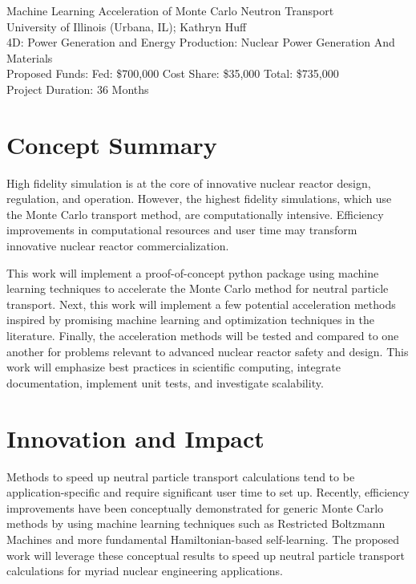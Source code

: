 \documentclass[letterpaper,12pt]{article}
\date{}
\newcommand*\fourteenpt{\fontsize{14}{14}\selectfont}
\begin{document}
\thispagestyle{fancy}
\begin{center}
{\fourteenpt Machine Learning Acceleration of Monte Carlo Neutron Transport}\\
\vspace{3mm}
University of Illinois (Urbana, IL); Kathryn Huff\\
\vspace{3mm}
4D: Power Generation and Energy Production: Nuclear Power Generation And Materials\\
Proposed Funds: Fed: \$700,000\/ Cost Share: \$35,000\/ Total: \$735,000\\
Project Duration: 36 Months\\
\end{center}

\section{Concept Summary}

High fidelity simulation is at the core of innovative nuclear reactor design,
regulation, and operation. However, the highest fidelity simulations,
which use the Monte Carlo transport method, are computationally intensive.
Efficiency improvements in computational resources and user time may transform
innovative nuclear reactor commercialization.

This work will implement a proof-of-concept python package using machine 
learning techniques to accelerate the Monte Carlo method for neutral particle transport.
Next, this work will implement a few potential acceleration methods inspired 
by promising machine learning and optimization techniques in the literature.
Finally, the acceleration methods will be tested and compared to one another for
problems relevant to advanced nuclear reactor safety and design.
This work will emphasize best practices in
scientific computing, integrate documentation, implement unit
tests, and investigate scalability. 

\section{Innovation and Impact}
Methods to speed up neutral particle transport calculations tend to be 
application-specific and require significant user time to set up. Recently, 
efficiency improvements have been conceptually demonstrated for generic Monte 
Carlo methods by using machine learning techniques such as Restricted Boltzmann 
Machines\cite{huang_accelerated_2017} and more fundamental Hamiltonian-based 
self-learning\cite{liu_self-learning_2017}. The proposed work will leverage 
these conceptual results to speed up neutral particle transport calculations 
for myriad nuclear engineering applications. 
\FloatBarrier
\end{document}
